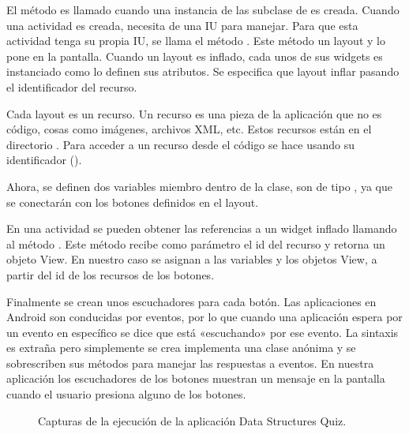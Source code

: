 El método  es llamado cuando una instancia de las subclase
de  es creada. Cuando una actividad es creada, necesita de una IU para
manejar. Para que esta actividad tenga su propia IU, se llama el método
. Este método  un layout y lo pone en la pantalla.
Cuando un layout es inflado, cada unos de sus widgets es instanciado como
lo definen sus atributos. Se especifica que layout inflar pasando el identificador
del recurso.

Cada layout es un recurso. Un recurso es una pieza de la aplicación que no es
código, cosas como imágenes, archivos XML, etc. Estos recursos están en
el directorio . Para acceder a un recurso desde el código se hace
usando su identificador ().

Ahora, se definen dos variables miembro dentro de la clase, son de tipo
, ya que se conectarán con los botones definidos en el layout.

En una actividad se pueden obtener las referencias a un widget inflado llamando
al método . Este método recibe como parámetro el id del recurso
y retorna un objeto View. En nuestro caso se asignan a las variables
 y  los objetos View, a partir del id
de los recursos de los botones.

Finalmente se crean unos escuchadores para cada botón. Las aplicaciones en
Android son conducidas por eventos, por lo que cuando una aplicación espera
por un evento en específico se dice que está «escuchando» por ese evento. La
sintaxis es extraña pero simplemente se crea implementa una clase anónima
y se sobrescriben sus métodos para manejar las respuestas a eventos. En nuestra
aplicación los escuchadores de los botones muestran un mensaje en la pantalla
cuando el usuario presiona alguno de los botones.


\begin{figure}%
    \centering
    \qquad
    \caption{Capturas de la ejecución de la aplicación  Data Structures Quiz.}
    \label{fig:quiz_app}%
\end{figure}

